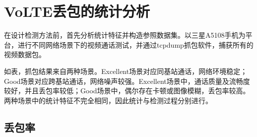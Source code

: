 \section{VoLTE丢包的统计分析}
\label{chap:analyze:results}

在设计检测方法前，首先分析统计特征并构造参照数据集。以三星A5108手机为平台，进行不同网络场景下的视频通话测试，并通过tcpdump抓包软件，捕获所有的视频数据包。

如表，抓包结果来自两种场景。Excellent场景对应同基站通话，网络环境稳定；Good场景对应跨基站通话，网络噪声较强。Excellent场景中，通话质量及流畅度较好，并且丢包率较低；Good场景中，偶尔存在卡顿或图像模糊，丢包率较高。两种场景中的统计特征不完全相同，因此统计与检测过程分别进行。

\subsection{丢包率}
\label{chap:analyze:results:plr}

